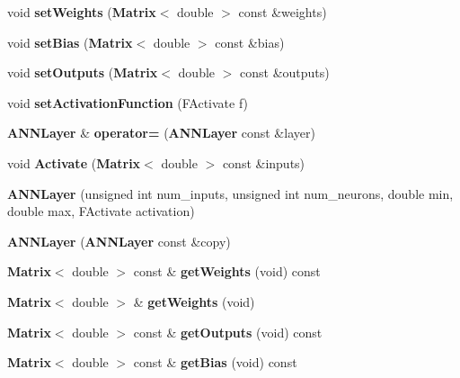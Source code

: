\begin{DoxyCompactItemize}
\item 
void {\bfseries set\+Weights} ({\bf Matrix}$<$ double $>$ const \&weights)\label{class_g_a_n_n_1_1_a_n_n_layer_a99b44245e660160e6431f4bd8b7cf8ed}

\item 
void {\bfseries set\+Bias} ({\bf Matrix}$<$ double $>$ const \&bias)\label{class_g_a_n_n_1_1_a_n_n_layer_a33b17fa33318cc5ab3060025ccf90faf}

\item 
void {\bfseries set\+Outputs} ({\bf Matrix}$<$ double $>$ const \&outputs)\label{class_g_a_n_n_1_1_a_n_n_layer_a7249be13922695f54aa3ed0b888584b8}

\item 
void {\bfseries set\+Activation\+Function} (F\+Activate f)\label{class_g_a_n_n_1_1_a_n_n_layer_afee60047b0ccb6d2b92f75d4b55febdc}

\item 
{\bf A\+N\+N\+Layer} \& {\bfseries operator=} ({\bf A\+N\+N\+Layer} const \&layer)\label{class_g_a_n_n_1_1_a_n_n_layer_a2b22cd2b08de3d0b41615dd6be0198d4}

\item 
void {\bfseries Activate} ({\bf Matrix}$<$ double $>$ const \&inputs)\label{class_g_a_n_n_1_1_a_n_n_layer_aa8388e643e0916ad8366bb8abc227331}

\item 
{\bfseries A\+N\+N\+Layer} (unsigned int num\+\_\+inputs, unsigned int num\+\_\+neurons, double min, double max, F\+Activate activation)\label{class_g_a_n_n_1_1_a_n_n_layer_a98a15401495eddad363a75c2ab9c5773}

\item 
{\bfseries A\+N\+N\+Layer} ({\bf A\+N\+N\+Layer} const \&copy)\label{class_g_a_n_n_1_1_a_n_n_layer_a89236bd33096986ab0efa417d4cbcb1c}

\item 
{\bf Matrix}$<$ double $>$ const \& {\bfseries get\+Weights} (void) const \label{class_g_a_n_n_1_1_a_n_n_layer_ab2ccaae743a40f1f39595f983db22a8d}

\item 
{\bf Matrix}$<$ double $>$ \& {\bfseries get\+Weights} (void)\label{class_g_a_n_n_1_1_a_n_n_layer_abd06bed4090d09e09669e9ff56b4659a}

\item 
{\bf Matrix}$<$ double $>$ const \& {\bfseries get\+Outputs} (void) const \label{class_g_a_n_n_1_1_a_n_n_layer_a47fbef47e9c7c0ef638aed2a2bd30974}

\item 
{\bf Matrix}$<$ double $>$ const \& {\bfseries get\+Bias} (void) const \label{class_g_a_n_n_1_1_a_n_n_layer_a23a78b0d4255e3480872ba6df6562290}


\end{DoxyCompactItemize}
